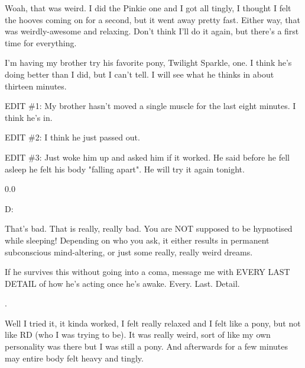 \documentclass[ebook,12pt,oneside,openany]{memoir}
\begin{document}
\begin{tcolorbox}[title=Inkie]
\par{Woah, that was weird. I did the Pinkie one and I got all tingly, I thought I felt the hooves coming on for a second, but it went away pretty fast. Either way, that was weirdly-awesome and relaxing. Don't think I'll do it again, but there's a first time for everything.}
\end{tcolorbox}
\begin{tcolorbox}[title=SilverStarApple]
\begin{tcolorbox}[title=Thoix]
\par{I'm having my brother try his favorite pony, Twilight Sparkle, one.  I think he's doing better than I did, but I can't tell.  I will see what he thinks in about thirteen minutes.}
\newline{}
\par{EDIT \#1:  My brother hasn't moved a single muscle for the last eight minutes.  I think he's in.}
\newline{}
\par{EDIT \#2:  I think he just passed out.}
\newline{}
\par{EDIT \#3:  Just woke him up and asked him if it worked.  He said before he fell asleep he felt his body "falling apart".  He will try it again tonight.}
\end{tcolorbox}
\par{0.0}
\newline{}
\par{D:}
\newline{}
\par{That's bad. That is really, really bad. You are NOT supposed to be hypnotised while sleeping! Depending on who you ask, it either results in permanent subconscious mind-altering, or just some really, really weird dreams.}
\newline{}
\par{If he survives this without going into a coma, message me with EVERY LAST DETAIL of how he's acting once he's awake. Every. Last. Detail.}
\end{tcolorbox}
\begin{tcolorbox}[title=Ink]
\par{.}
\end{tcolorbox}
\begin{tcolorbox}[title=GoldenShield]
\par{Well I tried it, it kinda worked, I felt really relaxed and I felt like a pony, but not like RD (who I was trying to be). It was really weird, sort of like my own personality was there but I was still a pony. And afterwards for a few minutes may entire body felt heavy and tingly.}
\end{tcolorbox}
\end{document}
